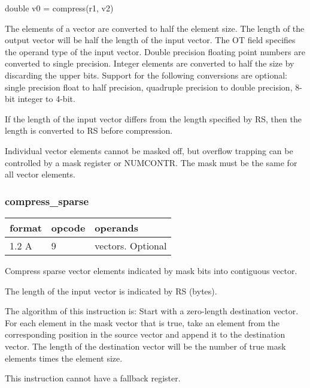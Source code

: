 \documentclass[forwardcom.tex]{subfiles}
\begin{document}
double v0 = compress(r1, v2)
\vspace{2mm}

The elements of a vector are converted to half the element size. The length of the output vector will be half the length of the input vector. The OT field specifies the operand type of the input vector. Double precision floating point numbers are converted to single precision. Integer elements are converted to half the size by discarding the upper bits. Support for the following conversions are optional: single precision float to half precision, quadruple precision to double precision, 8-bit integer to 4-bit.
\vspace{2mm}

If the length of the input vector differs from the length specified by RS, then the length is converted to RS before compression.
\vspace{2mm}

Individual vector elements cannot be masked off, but overflow trapping can be controlled by a mask register or NUMCONTR. The mask must be the same for all vector elements.
\vspace{2mm}

\subsubsection{compress\_sparse}
\label{table:compressSparseInstruction}
\begin{tabular}{|p{12mm}|p{12mm}|p{110mm}|}
\hline
\bfseries format & \bfseries opcode & \bfseries operands \\ \hline
1.2 A & 9 & vectors. Optional \\ \hline
\end{tabular}
\vspace{2mm}

Compress sparse vector elements indicated by mask bits into contiguous vector. 

The length of the input vector is indicated by RS (bytes).
\vspace{2mm}

The algorithm of this instruction is:
Start with a zero-length destination vector.
For each element in the mask vector that is true, take an element from the corresponding position in the source vector and append it to the destination vector.
The length of the destination vector will be the number of true mask elements
times the element size.
\vspace{2mm}

This instruction cannot have a fallback register.
\end{document}
